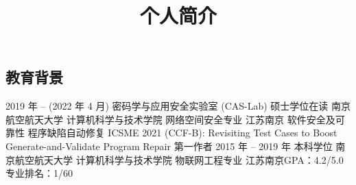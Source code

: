 \documentclass[11pt,a4paper,sans]{moderncv}   %
\title{个人简介}                     %
\begin{document}
\begin{CJK}{UTF8}{gbsn}                       %
\maketitle

\section{教育背景}
\cventry
{2019 年 -- (2022 年 4 月)}
{密码学与应用安全实验室 (CAS-Lab) 硕士学位在读}
{南京航空航天大学 计算机科学与技术学院 网络空间安全专业}
{江苏南京}{}{
  软件安全及可靠性 程序缺陷自动修复 \newline{}
  ICSME 2021 (CCF-B): Revisiting Test Cases to Boost Generate-and-Validate Program Repair 第一作者 \newline{}
}  %
\cventry
{2015 年 -- 2019 年}
{本科学位}
{南京航空航天大学 计算机科学与技术学院 物联网工程专业}
{江苏南京}{}{GPA：4.2/5.0 专业排名：1/60}




\end{CJK}
\end{document}
